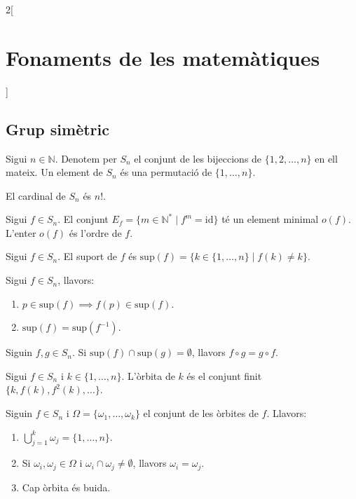 \documentclass[class=article,10pt,crop=false]{standalone}
\begin{document}
\begin{multicols}{2}[\section{Fonaments de les matemàtiques}]
\subsection{Grup simètric}
\begin{definition}
Sigui $n\in\mathbb{N}$. Denotem per $S_n$ el conjunt de les bijeccions de $\{1,2,\ldots,n\}$ en ell mateix. Un element de $S_n$ és una permutació de $\{1,\ldots,n\}$.
\end{definition}
\begin{theorem}
El cardinal de $S_n$ és $n!$.
\end{theorem}
\begin{definition}
Sigui $f\in S_n$. El conjunt $E_f=\{m\in\mathbb{N}^*\mid f^m=\text{id}\}$ té un element minimal $o(f)$. L'enter $o(f)$ és l'ordre de $f$.
\end{definition}
\begin{definition}
Sigui $f\in S_n$. El suport de $f$ és $\text{sup}(f)=\{k\in\{1,\ldots,n\}\mid f(k)\ne k\}$.
\end{definition}
\begin{lemma}
Sigui $f\in S_n$, llavors:
\begin{enumerate}
    \item $p\in\text{sup}(f)\implies f(p)\in\text{sup}(f)$.
    \item $\text{sup}(f)=\text{sup}(f^{-1})$.
\end{enumerate}
\end{lemma}
\begin{lemma}
Siguin $f,g\in S_n$. Si $\text{sup}(f)\cap\text{sup}(g)=\emptyset$, llavors $f\circ g=g\circ f$.
\end{lemma}
\begin{definition}
Sigui $f\in S_n$ i $k\in\{1,\ldots,n\}$. L'òrbita de $k$ és el conjunt finit $\{k,f(k),f^2(k),\ldots\}$.
\end{definition}
\begin{theorem}
Siguin $f\in S_n$ i $\Omega=\{\omega_1,\ldots,\omega_k\}$ el conjunt de les òrbites de $f$. Llavors:
\begin{enumerate}
    \item $\bigcup_{j=1}^k \omega_j=\{1,\ldots,n\}$.
    \item Si $\omega_i,\omega_j\in\Omega$ i $\omega_i\cap\omega_j\ne\emptyset$, llavors $\omega_i=\omega_j$.
    \item Cap òrbita és buida.
\end{enumerate}
\end{theorem}
\begin{theorem}

\end{theorem}
\end{multicols}
\end{document}
